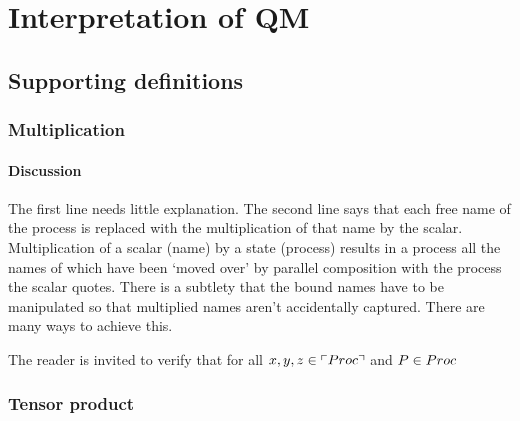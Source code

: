 \section{Interpretation of QM}
\subsection{Supporting definitions}
\subsubsection{Multiplication}

\paragraph{Discussion}
The first line needs little explanation. The second line says that
each free name of the process is replaced with the multiplication of
that name by the scalar. Multiplication of a scalar (name) by a state
(process) results in a process all the names of which have been `moved
over' by parallel composition with the process the scalar
quotes. There is a subtlety that the bound names have to be
manipulated so that multiplied names aren't accidentally
captured. There are many ways to achieve this.

\begin{remark}\label{rem:multiplication_identities}
  The reader is invited to verify that for all $x,y,z \in \ulcorner \mathbin{Proc} \urcorner$ and $P \in \mathbin{Proc}$
\end{remark}

\subsubsection{Tensor product}

